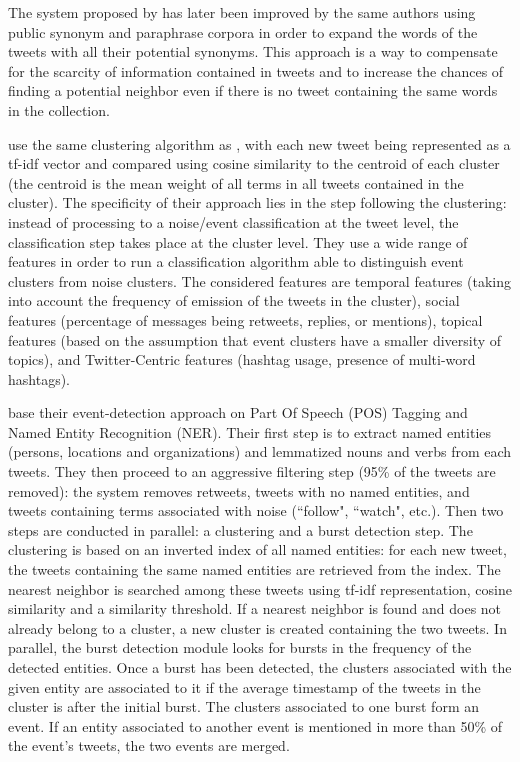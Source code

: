 The system proposed by \citet{petrovic_streaming_2010} has later been improved by the same authors \citep{petrovic_using_2012} using public synonym and paraphrase corpora in order to expand the words of the tweets with all their potential synonyms. This approach is a way to compensate for the scarcity of information contained in tweets and to increase the chances of finding a potential neighbor even if there is no tweet containing the same words in the collection.

\citet{becker_beyond_2011} use the same clustering algorithm as \citet{sankaranarayanan_twitterstand:_2009}, with each new tweet being represented as a tf-idf vector and compared using cosine similarity to the centroid of each cluster (the centroid is the mean weight of all terms in all tweets contained in the cluster). The specificity of their approach lies in the step following the clustering: instead of processing to a noise/event classification at the tweet level, the classification step takes place at the cluster level. They use a wide range of features in order to run a classification algorithm able to distinguish event clusters from noise clusters. The considered features are temporal features (taking into account the frequency of emission of the tweets in the cluster), social features (percentage of messages being retweets, replies, or mentions), topical features (based on the assumption that event clusters have a smaller diversity of topics), and Twitter-Centric features (hashtag usage, presence of multi-word hashtags).

\citet{mcminn_real_2015} base their event-detection approach on Part Of Speech (POS) Tagging and Named Entity Recognition (NER). Their first step is to extract named entities (persons, locations and organizations) and lemmatized nouns and verbs from each tweets. They then proceed to an aggressive filtering step (95\% of the tweets are removed): the system removes retweets, tweets with no named entities, and tweets containing terms associated with noise (``follow", ``watch", etc.). Then two steps are conducted in parallel: a clustering and a burst detection step. The clustering is based on an inverted index of all named entities: for each new tweet, the tweets containing the same named entities are retrieved from the index. The nearest neighbor is searched among these tweets using tf-idf representation, cosine similarity and a similarity threshold. If a nearest neighbor is found and does not already belong to a cluster, a new cluster is created containing the two tweets. In parallel, the burst detection module looks for bursts in the frequency of the detected entities. Once a burst has been detected, the clusters associated with the given entity are associated to it if the average timestamp of the tweets in the cluster is after the initial burst. The clusters associated to one burst form an event. If an entity associated to another event is mentioned in more than 50\% of the event's tweets, the two events are merged.

